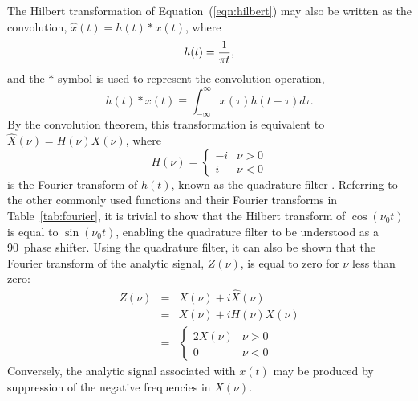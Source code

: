 \documentclass[twocolumn]{aastex6}
\newcommand{\Eqn}[1]{Equation~(\ref{eqn:#1})}
\newcommand{\Tab}[1]{Table~\ref{tab:#1}}
\newcommand{\Ci}{\ensuremath{i}}
\begin{document}
\begin{appendix}
The Hilbert transformation of \Eqn{hilbert} may also be
written as the convolution, $\hat{x}(t)=h(t)*x(t)$, where
\[
h(t) = {1\over{\pi t}},
\]
and the $*$ symbol is used to represent the convolution operation,
\begin{equation}
h(t)*x(t)\equiv\int_{-\infty}^{\infty}{x(\tau)h(t-\tau)d\tau}.
\end{equation}
By the convolution theorem, this transformation is equivalent to 
$\hat{X}(\nu)=H(\nu)X(\nu)$, where
\begin{equation} H(\nu) = \left\{ \begin{array}{cc}
                -\Ci  & \nu > 0 \\
                \Ci & \nu < 0
                \end{array} \right.
\end{equation}
is the Fourier transform of $h(t)$, known as the quadrature
filter \citep{pap65}.  Referring to the other commonly used functions
and their Fourier transforms in \Tab{fourier}, it is trivial to show
that the Hilbert transform of $\cos(\nu_0t)$ is equal to
$\sin(\nu_0t)$, enabling the quadrature filter to be understood as a
90\degr\ phase shifter.  Using the quadrature filter, it can also be
shown that the Fourier transform of the analytic signal, $Z(\nu)$, is
equal to zero for $\nu$ less than zero:
\begin{eqnarray}
 Z(\nu) & = & X(\nu) + \Ci\hat X(\nu) \nonumber \\
	& = & X(\nu) + \Ci H(\nu)X(\nu) \nonumber \\
	& = & \left \{ \begin{array}{cc} 
	2X(\nu)  & \nu > 0 \\
	0 & \nu < 0 
	\end{array} \right. \nonumber
\end{eqnarray}
Conversely, the analytic signal associated with $x(t)$ may be produced
by suppression of the negative frequencies in $X(\nu)$.


\end{appendix}
\end{document}
